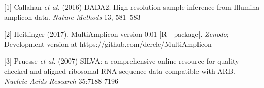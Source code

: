 \documentclass[30pt, a0paper, portrait, margin=0mm, innermargin=15mm,
               blockverticalspace=15mm, colspace=15mm, subcolspace=8mm]{tikzposter}
\begin{document}
\begin{columns}
{\begin{small}
          \hangindent=2cm [1] Callahan \textit{et al.} (2016) DADA2:
          High-resolution sample inference from Illumina amplicon data.
          \textit{Nature Methods} 13, 581--583

          \hangindent=2cm [2] Heitlinger (2017). MultiAmplicon version
          0.01 [R - package]. \textit{Zenodo}; Development version at
          https://github.com/derele/MultiAmplicon

          \hangindent=2cm [3] Pruesse \textit{et al.} (2007) SILVA: a
          comprehensive online resource for quality checked and
          aligned ribosomal RNA sequence data compatible with
          ARB. \textit{Nucleic Acids Research} 35:7188-7196

          
        \end{small}
      }


\end{columns}

\end{document}
